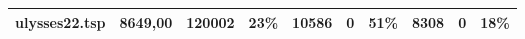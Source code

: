 \begin{table}[H]
\begin{tabular}{|l|l|l|l|l|l|l|l|l|l|}
{\color[HTML]{000000} ulysses22.tsp}                                                                    & {\color[HTML]{000000} 8649,00}                   & {\color[HTML]{000000} 120002}             & {\color[HTML]{000000} 23\%}                 & {\color[HTML]{000000} 10586}                     & {\color[HTML]{000000} 0}                  & {\color[HTML]{000000} 51\%}                 & {\color[HTML]{000000} 8308}                      & {\color[HTML]{000000} 0}                  & {\color[HTML]{000000} 18\%}                 \\ \hline
\end{tabular}
\end{table}